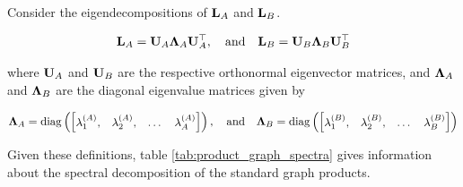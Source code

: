 Consider the eigendecompositions of $\mathbf{L}_A$ and $\mathbf{L}_B$.

\begin{equation}
    \mathbf{L}_A = \mathbf{U}_A \mathbf{\Lambda}_A \mathbf{U}_A^\top, \quad \text{and} \quad \mathbf{L}_B = \mathbf{U}_B \mathbf{\Lambda}_B \mathbf{U}_B^\top
\end{equation}

where $\mathbf{U}_A$ and $\mathbf{U}_B$ are the respective orthonormal eigenvector matrices, and $\mathbf{\Lambda}_A$ and $\mathbf{\Lambda}_B$ are the diagonal eigenvalue matrices given by

\begin{equation*}
    \mathbf{\Lambda}_A = \text{\textup{diag}}\left(\begin{bmatrix} \lambda_1^{(A)}, & \lambda_2^{(A)}, & \dots & \lambda_A^{(A)} \end{bmatrix}\right),
    \quad \text{and} \quad
    \mathbf{\Lambda}_B = \text{\textup{diag}}\left(\begin{bmatrix} \lambda_1^{(B)}, & \lambda_2^{(B)}, & \dots & \lambda_B^{(B)} \end{bmatrix}\right)
\end{equation*}

Given these definitions, table \ref{tab:product_graph_spectra} gives information about the spectral decomposition of the standard graph products.

